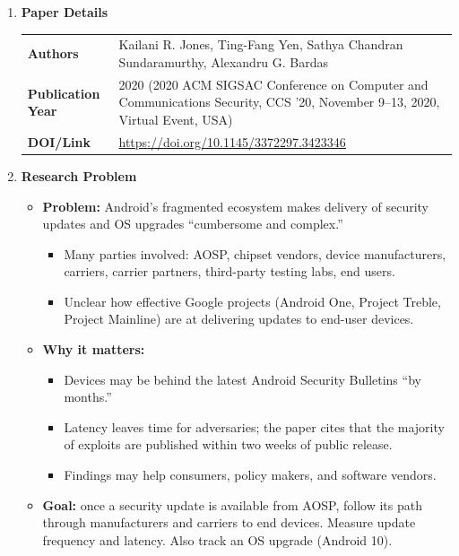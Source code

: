 \documentclass[11pt,a4paper]{article}
\newcommand{\entrypart}[1]{\textbf{\color{accent}#1}\par\vspace{2pt}}
\begin{document}
\begin{enumerate}

    \item \entrypart{Paper Details}

    \begin{tabular}{@{}>{\bfseries}p{3.2cm} p{11.5cm}@{}}
        Authors          & Kailani R. Jones, Ting-Fang Yen, Sathya Chandran Sundaramurthy, Alexandru G. Bardas \\[2pt]
        Publication Year & 2020 (2020 ACM SIGSAC Conference on Computer and Communications Security, CCS '20, November 9--13, 2020, Virtual Event, USA) \\[2pt]
        DOI/Link         & \url{https://doi.org/10.1145/3372297.3423346}
    \end{tabular}

    \item \entrypart{Research Problem}
    \begin{itemize}[leftmargin=*, itemsep=1pt, topsep=2pt]
        \item \textbf{Problem:} Android's fragmented ecosystem makes delivery of security updates and OS upgrades ``cumbersome and complex.''
        \begin{itemize}[itemsep=0pt]
            \item Many parties involved: AOSP, chipset vendors, device manufacturers, carriers, carrier partners, third-party testing labs, end users.
            \item Unclear how effective Google projects (Android One, Project Treble, Project Mainline) are at delivering updates to end-user devices.
        \end{itemize}
        \item \textbf{Why it matters:}
        \begin{itemize}[itemsep=0pt]
            \item Devices may be behind the latest Android Security Bulletins ``by months.''
            \item Latency leaves time for adversaries; the paper cites that the majority of exploits are published within two weeks of public release.
            \item Findings may help consumers, policy makers, and software vendors.
        \end{itemize}
        \item \textbf{Goal:} once a security update is available from AOSP, follow its path through manufacturers and carriers to end devices. Measure update frequency and latency. Also track an OS upgrade (Android 10).

\end{itemize}
\end{enumerate}
\end{document}
